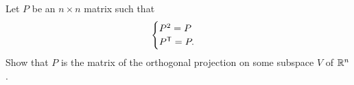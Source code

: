 \documentclass[11pt,nocut]{article}
\begin{document}
\vspace{1mm}


\begin{problem}[$\star$]
	Let $P$ be an $n \times n$ matrix such that
	$$
	\begin{cases}
		P^2 = P \\
		P^{{\sf T}} = P.
	\end{cases}
	$$
	Show that $P$ is the matrix of the orthogonal projection on some subspace $V$ of $\mathbb{R}^n$.
\end{problem}
\vspace{1cm}
\centerline{}

%
%
\end{document}
